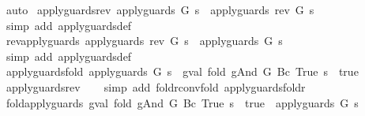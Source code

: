 \begin{isabellebody}
\ auto\isanewline
{}\isamarkupfalse%
%
\endisatagproof
{\isafoldproof}%
%
\isadelimproof
\isanewline
%
\endisadelimproof
\isanewline
{}\isamarkupfalse%
\ apply{\isacharunderscore}guards{\isacharunderscore}rev{\isacharcolon}\ {\isachardoublequoteopen}apply{\isacharunderscore}guards\ G\ s\ {\isacharequal}\ apply{\isacharunderscore}guards\ {\isacharparenleft}rev\ G{\isacharparenright}\ s{\isachardoublequoteclose}\isanewline
%
\isadelimproof
\ \ %
\endisadelimproof
%
\isatagproof
{}\isamarkupfalse%
\ {\isacharparenleft}simp\ add{\isacharcolon}\ apply{\isacharunderscore}guards{\isacharunderscore}def{\isacharparenright}%
\endisatagproof
{\isafoldproof}%
%
\isadelimproof
\isanewline
%
\endisadelimproof
\isanewline
{}\isamarkupfalse%
\ rev{\isacharunderscore}apply{\isacharunderscore}guards{\isacharcolon}\ {\isachardoublequoteopen}apply{\isacharunderscore}guards\ {\isacharparenleft}rev\ G{\isacharparenright}\ s\ {\isacharequal}\ apply{\isacharunderscore}guards\ G\ s{\isachardoublequoteclose}\isanewline
%
\isadelimproof
\ \ %
\endisadelimproof
%
\isatagproof
{}\isamarkupfalse%
\ {\isacharparenleft}simp\ add{\isacharcolon}\ apply{\isacharunderscore}guards{\isacharunderscore}def{\isacharparenright}%
\endisatagproof
{\isafoldproof}%
%
\isadelimproof
\isanewline
%
\endisadelimproof
\isanewline
{}\isamarkupfalse%
\ apply{\isacharunderscore}guards{\isacharunderscore}fold{\isacharcolon}\ {\isachardoublequoteopen}apply{\isacharunderscore}guards\ G\ s\ {\isacharequal}\ {\isacharparenleft}gval\ {\isacharparenleft}fold\ gAnd\ G\ {\isacharparenleft}Bc\ True{\isacharparenright}{\isacharparenright}\ s\ {\isacharequal}\ true{\isacharparenright}{\isachardoublequoteclose}\isanewline
%
\isadelimproof
\ \ %
\endisadelimproof
%
\isatagproof
{}\isamarkupfalse%
\ apply{\isacharunderscore}guards{\isacharunderscore}rev\isanewline
\ \ \isamarkupfalse%
\ {\isacharparenleft}simp\ add{\isacharcolon}\ foldr{\isacharunderscore}conv{\isacharunderscore}fold\ apply{\isacharunderscore}guards{\isacharunderscore}foldr{\isacharparenright}%
\endisatagproof
{\isafoldproof}%
%
\isadelimproof
\isanewline
%
\endisadelimproof
\isanewline
{}\isamarkupfalse%
\ fold{\isacharunderscore}apply{\isacharunderscore}guards{\isacharcolon}\ {\isachardoublequoteopen}{\isacharparenleft}gval\ {\isacharparenleft}fold\ gAnd\ G\ {\isacharparenleft}Bc\ True{\isacharparenright}{\isacharparenright}\ s\ {\isacharequal}\ true{\isacharparenright}\ {\isacharequal}\ apply{\isacharunderscore}guards\ G\ s{\isachardoublequoteclose}\isanewline

\end{isabellebody}
